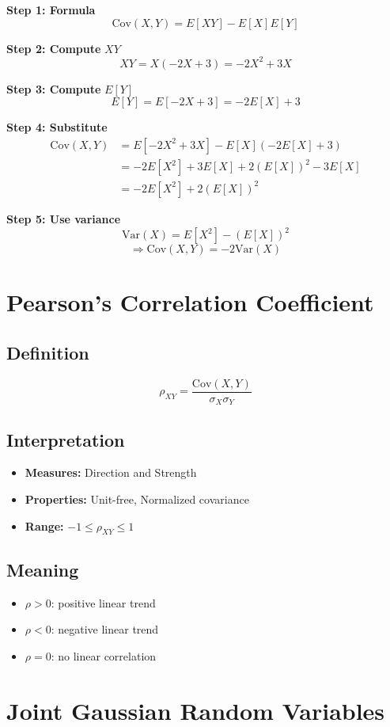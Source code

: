\documentclass[12pt,a4paper]{article}
\begin{document}
\textbf{Step 1: Formula}
\[
\text{Cov}(X,Y)=E[XY] - E[X]E[Y]
\]

\textbf{Step 2: Compute } $XY$
\[
XY = X(-2X+3) = -2X^2 + 3X
\]

\textbf{Step 3: Compute } $E[Y]$
\[
E[Y] = E[-2X+3] = -2E[X] + 3
\]

\textbf{Step 4: Substitute}
\begin{align*}
\text{Cov}(X,Y) &= E[-2X^2+3X] - E[X](-2E[X] + 3) \\
&= -2E[X^2] + 3E[X] + 2(E[X])^2 - 3E[X] \\
&= -2E[X^2] + 2(E[X])^2
\end{align*}

\textbf{Step 5: Use variance}
\[
\text{Var}(X)=E[X^2]-(E[X])^2
\]
\[
\Rightarrow \text{Cov}(X,Y) = -2\text{Var}(X)
\]

\section{Pearson's Correlation Coefficient}

\subsection{Definition}
\[
\rho_{XY} = \frac{\text{Cov}(X,Y)}{\sigma_X \sigma_Y}
\]

\subsection{Interpretation}
\begin{itemize}
    \item \textbf{Measures:} Direction and Strength
    \item \textbf{Properties:} Unit-free, Normalized covariance
    \item \textbf{Range:} $-1 \le \rho_{XY} \le 1$
\end{itemize}

\subsection{Meaning}
\begin{itemize}
    \item $\rho > 0$: positive linear trend
    \item $\rho < 0$: negative linear trend
    \item $\rho = 0$: no linear correlation
\end{itemize}

\section{Joint Gaussian Random Variables}
\end{document}
